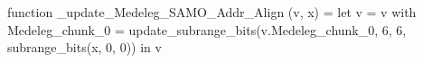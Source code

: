 function _update_Medeleg_SAMO_Addr_Align (v, x) = let v = { v with Medeleg_chunk_0 = update_subrange_bits(v.Medeleg_chunk_0, 6, 6, subrange_bits(x, 0, 0)) } in
  v
